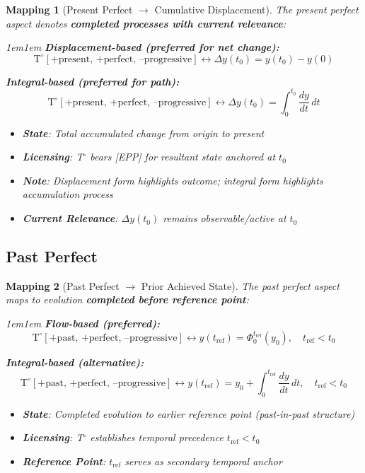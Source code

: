 \documentclass[11pt]{article}
\theoremstyle{defstyle}
\theoremstyle{mapstyle}
\newtheorem{mapping}{Mapping}[section]
\begin{document}
\begin{mapping}[Present Perfect $\to$ Cumulative Displacement]
The present perfect aspect denotes \textbf{completed processes with current relevance}:

\begin{adjustwidth}{1em}{1em}
\noindent\textbf{Displacement-based (preferred for net change):}
\[
\boxed{\mathrm{T}^\circ[\text{+present, +perfect, --progressive}] \longleftrightarrow \Delta y(t_0) = y(t_0) - y(0)}
\]

\noindent\textbf{Integral-based (preferred for path):}
\[
\boxed{\mathrm{T}^\circ[\text{+present, +perfect, --progressive}] \longleftrightarrow \Delta y(t_0) = \int_0^{t_0} \frac{dy}{dt}\,dt}
\]
\end{adjustwidth}

\begin{itemize}
\item \textbf{State}: Total accumulated change from origin to present
\item \textbf{Licensing}: T$^\circ$ bears [EPP] for resultant state anchored at $t_0$
\item \textbf{Note}: Displacement form highlights outcome; integral form highlights accumulation process
\item \textbf{Current Relevance}: $\Delta y(t_0)$ remains observable/active at $t_0$
\end{itemize}
\end{mapping}

\subsection{Past Perfect}

\begin{mapping}[Past Perfect $\to$ Prior Achieved State]
The past perfect aspect maps to evolution \textbf{completed before reference point}:

\begin{adjustwidth}{1em}{1em}
\noindent\textbf{Flow-based (preferred):}
\[
\boxed{\mathrm{T}^\circ[\text{+past, +perfect, --progressive}] \longleftrightarrow y(t_{\mathrm{ref}}) = \Phi_0^{t_{\mathrm{ref}}}(y_0), \quad t_{\mathrm{ref}} < t_0}
\]

\noindent\textbf{Integral-based (alternative):}
\[
\boxed{\mathrm{T}^\circ[\text{+past, +perfect, --progressive}] \longleftrightarrow y(t_{\mathrm{ref}}) = y_0 + \int_0^{t_{\mathrm{ref}}} \frac{dy}{dt}\,dt, \quad t_{\mathrm{ref}} < t_0}
\]
\end{adjustwidth}

\begin{itemize}
\item \textbf{State}: Completed evolution to earlier reference point (past-in-past structure)
\item \textbf{Licensing}: T$^\circ$ establishes temporal precedence $t_{\mathrm{ref}} < t_0$
\item \textbf{Reference Point}: $t_{\mathrm{ref}}$ serves as secondary temporal anchor
\end{itemize}
\end{mapping}
\end{document}
